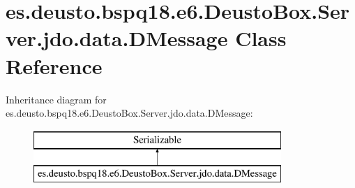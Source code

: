 \hypertarget{classes_1_1deusto_1_1bspq18_1_1e6_1_1_deusto_box_1_1_server_1_1jdo_1_1data_1_1_d_message}{}\section{es.\+deusto.\+bspq18.\+e6.\+Deusto\+Box.\+Server.\+jdo.\+data.\+D\+Message Class Reference}
\label{classes_1_1deusto_1_1bspq18_1_1e6_1_1_deusto_box_1_1_server_1_1jdo_1_1data_1_1_d_message}
Inheritance diagram for es.\+deusto.\+bspq18.\+e6.\+Deusto\+Box.\+Server.\+jdo.\+data.\+D\+Message\+:\begin{figure}[H]
\begin{center}
\leavevmode
\includegraphics[height=2.000000cm]{classes_1_1deusto_1_1bspq18_1_1e6_1_1_deusto_box_1_1_server_1_1jdo_1_1data_1_1_d_message}
\end{center}
\end{figure}
